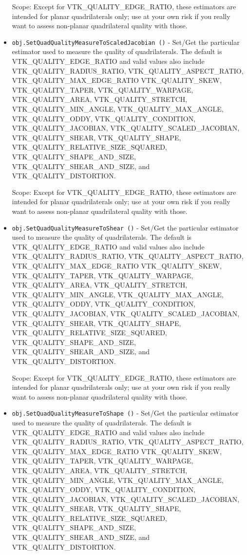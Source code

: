 \begin{itemize}
 Scope: Except for VTK\_QUALITY\_EDGE\_RATIO, these estimators are intended for planar
 quadrilaterals only; use at your own risk if you really want to assess non-planar
 quadrilateral quality with those.

\item  \verb|obj.SetQuadQualityMeasureToScaledJacobian ()| -  Set/Get the particular estimator used to measure the quality of quadrilaterals.
 The default is VTK\_QUALITY\_EDGE\_RATIO and valid values also include
 VTK\_QUALITY\_RADIUS\_RATIO, VTK\_QUALITY\_ASPECT\_RATIO, VTK\_QUALITY\_MAX\_EDGE\_RATIO
 VTK\_QUALITY\_SKEW, VTK\_QUALITY\_TAPER, VTK\_QUALITY\_WARPAGE, VTK\_QUALITY\_AREA,
 VTK\_QUALITY\_STRETCH, VTK\_QUALITY\_MIN\_ANGLE, VTK\_QUALITY\_MAX\_ANGLE,
 VTK\_QUALITY\_ODDY, VTK\_QUALITY\_CONDITION, VTK\_QUALITY\_JACOBIAN,
 VTK\_QUALITY\_SCALED\_JACOBIAN, VTK\_QUALITY\_SHEAR, VTK\_QUALITY\_SHAPE,
 VTK\_QUALITY\_RELATIVE\_SIZE\_SQUARED, VTK\_QUALITY\_SHAPE\_AND\_SIZE,
 VTK\_QUALITY\_SHEAR\_AND\_SIZE, and VTK\_QUALITY\_DISTORTION.

 Scope: Except for VTK\_QUALITY\_EDGE\_RATIO, these estimators are intended for planar
 quadrilaterals only; use at your own risk if you really want to assess non-planar
 quadrilateral quality with those.

\item  \verb|obj.SetQuadQualityMeasureToShear ()| -  Set/Get the particular estimator used to measure the quality of quadrilaterals.
 The default is VTK\_QUALITY\_EDGE\_RATIO and valid values also include
 VTK\_QUALITY\_RADIUS\_RATIO, VTK\_QUALITY\_ASPECT\_RATIO, VTK\_QUALITY\_MAX\_EDGE\_RATIO
 VTK\_QUALITY\_SKEW, VTK\_QUALITY\_TAPER, VTK\_QUALITY\_WARPAGE, VTK\_QUALITY\_AREA,
 VTK\_QUALITY\_STRETCH, VTK\_QUALITY\_MIN\_ANGLE, VTK\_QUALITY\_MAX\_ANGLE,
 VTK\_QUALITY\_ODDY, VTK\_QUALITY\_CONDITION, VTK\_QUALITY\_JACOBIAN,
 VTK\_QUALITY\_SCALED\_JACOBIAN, VTK\_QUALITY\_SHEAR, VTK\_QUALITY\_SHAPE,
 VTK\_QUALITY\_RELATIVE\_SIZE\_SQUARED, VTK\_QUALITY\_SHAPE\_AND\_SIZE,
 VTK\_QUALITY\_SHEAR\_AND\_SIZE, and VTK\_QUALITY\_DISTORTION.

 Scope: Except for VTK\_QUALITY\_EDGE\_RATIO, these estimators are intended for planar
 quadrilaterals only; use at your own risk if you really want to assess non-planar
 quadrilateral quality with those.

\item  \verb|obj.SetQuadQualityMeasureToShape ()| -  Set/Get the particular estimator used to measure the quality of quadrilaterals.
 The default is VTK\_QUALITY\_EDGE\_RATIO and valid values also include
 VTK\_QUALITY\_RADIUS\_RATIO, VTK\_QUALITY\_ASPECT\_RATIO, VTK\_QUALITY\_MAX\_EDGE\_RATIO
 VTK\_QUALITY\_SKEW, VTK\_QUALITY\_TAPER, VTK\_QUALITY\_WARPAGE, VTK\_QUALITY\_AREA,
 VTK\_QUALITY\_STRETCH, VTK\_QUALITY\_MIN\_ANGLE, VTK\_QUALITY\_MAX\_ANGLE,
 VTK\_QUALITY\_ODDY, VTK\_QUALITY\_CONDITION, VTK\_QUALITY\_JACOBIAN,
 VTK\_QUALITY\_SCALED\_JACOBIAN, VTK\_QUALITY\_SHEAR, VTK\_QUALITY\_SHAPE,
 VTK\_QUALITY\_RELATIVE\_SIZE\_SQUARED, VTK\_QUALITY\_SHAPE\_AND\_SIZE,
 VTK\_QUALITY\_SHEAR\_AND\_SIZE, and VTK\_QUALITY\_DISTORTION.


\end{itemize}

